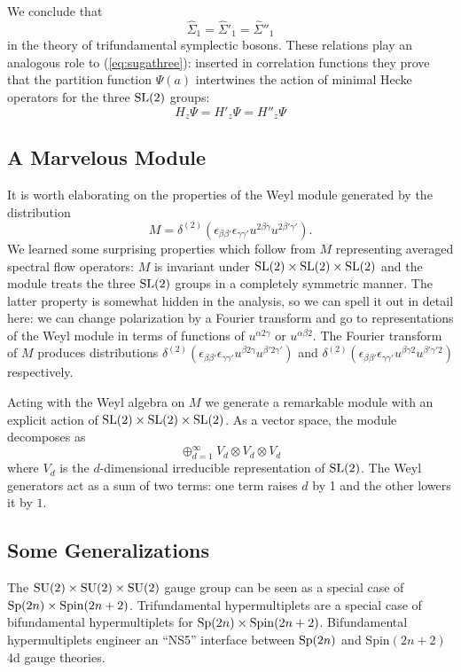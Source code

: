 \documentclass[11pt,a4paper]{article}
\begin{document}
We conclude that  
\begin{equation}
\hat \Sigma_{1} = \hat \Sigma'_{1} =\hat \Sigma''_{1}
\end{equation}
in the theory of trifundamental symplectic bosons. These relations play an analogous role to (\ref{eq:sugathree}): inserted in correlation functions they prove that the partition function $\Psi(a)$ intertwines the action of minimal Hecke operators for the three ${\mathrm{SL}}(2)$ groups:
\begin{equation}
\boxed{H_z \Psi =  H'_z \Psi = H''_z \Psi}
\end{equation}

\subsection{A Marvelous Module}\label{marvel}
It is worth elaborating on the properties of the Weyl module generated by the distribution 
\begin{equation}
M=\delta^{(2)}(\epsilon_{\beta \beta'}\epsilon_{\gamma \gamma'} u^{2\beta \gamma} u^{2 \beta' \gamma'}).
\end{equation}
We learned some surprising properties which follow from $M$ representing averaged spectral flow operators: 
$M$ is invariant under ${\mathrm{SL}}(2) \times {\mathrm{SL}}(2) \times {\mathrm{SL}}(2)$ and the module treats the three ${\mathrm{SL}}(2)$ groups in a completely symmetric manner. The latter property is somewhat hidden in the analysis, so we can spell it out in detail here: we can change polarization 
by a Fourier transform and go to representations of the Weyl module in terms of functions of $u^{\alpha 2 \gamma}$ or $u^{\alpha \beta 2}$. The Fourier transform of $M$ produces distributions $\delta^{(2)}(\epsilon_{\beta \beta'}\epsilon_{\gamma \gamma'} u^{\beta 2 \gamma} u^{\beta' 2\gamma'})$ and $\delta^{(2)}(\epsilon_{\beta \beta'}\epsilon_{\gamma \gamma'} u^{\beta \gamma 2} u^{\beta' \gamma' 2})$ respectively. 

Acting with the Weyl algebra on $M$ we generate a remarkable module with an explicit action of ${\mathrm{SL}}(2) \times {\mathrm{SL}}(2) \times {\mathrm{SL}}(2)$.
As a vector space, the module decomposes as 
\begin{equation}\label{marmod}
\oplus_{d=1}^\infty V_d\otimes V_d \otimes V_d
\end{equation}
where $V_d$ is the $d$-dimensional irreducible representation  of ${\mathrm{SL}}(2)$. The Weyl generators act as a sum of two terms: one term raises $d$ by 1 and the other lowers it by $1$. 

\subsection{Some Generalizations}
The ${\mathrm{SU}}(2) \times {\mathrm{SU}}(2) \times {\mathrm{SU}}(2)$ gauge group can be seen as a special case of ${\mathrm{Sp}}(2n) \times \mathrm{Spin}(2n+2)$. 
Trifundamental hypermultiplets are a special case of bifundamental hypermultiplets for ${\mathrm{Sp}}(2n) \times \mathrm{Spin}(2n+2)$.
Bifundamental hypermultiplets engineer an ``NS5'' interface between ${\mathrm{Sp}}(2n)$ and $\mathrm{Spin}(2n+2)$ 4d gauge theories. 
\end{document}
